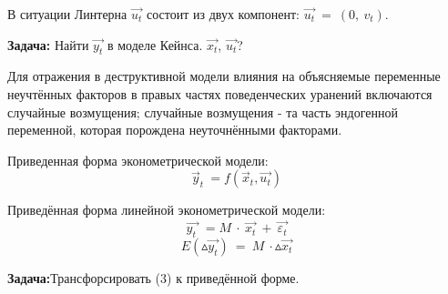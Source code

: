 \documentclass[12pt,a4paper]{article}
\begin{document}
	В ситуации Линтерна $\displaystyle \overrightarrow{u_{t}}$ состоит из двух компонент: $\displaystyle \overrightarrow{u_{t}} \ =\ ( 0,\ v_{t})$.

	\textbf{Задача:} Найти $\displaystyle \overrightarrow{y_{t}}$ в моделе Кейнса. $\displaystyle \overrightarrow{x_{t}}$, $\displaystyle \overrightarrow{u_{t}}$?

	Для отражения в деструктивной модели влияния на объясняемые переменные неучтённых факторов в правых частях поведенческих уранений включаются случайные возмущения; случайные возмущения - та часть эндогенной переменной, которая порождена неуточнёнными факторами.

	Приведенная форма эконометрической модели:
\begin{equation}
\vec{y}_{t} \ =f\left(\vec{x}_{t} ,\overrightarrow{u_{t}}\right)
\end{equation}

	Приведённая форма линейной эконометрической модели:
\begin{equation}
\overrightarrow{y_{t} \ } \ =M\ \cdotp \ \overrightarrow{x_{t}} \ +\ \overrightarrow{\varepsilon _{t}}
\end{equation}
\begin{equation}
E\left( \vartriangle \overrightarrow{y_{t}}\right) \ =\ M\ \cdotp \vartriangle \overrightarrow{x_{t}}
\end{equation}

\textbf{Задача:}Трансфорсировать (3) к приведённой форме.
\end{document}
